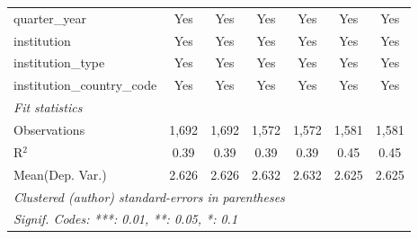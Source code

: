 \begin{tabular}{lcccccc}
   quarter\_year                      & Yes     & Yes      & Yes     & Yes     & Yes     & Yes\\  
   institution                        & Yes     & Yes      & Yes     & Yes     & Yes     & Yes\\  
   institution\_type                  & Yes     & Yes      & Yes     & Yes     & Yes     & Yes\\  
   institution\_country\_code         & Yes     & Yes      & Yes     & Yes     & Yes     & Yes\\  
   \midrule
   \emph{Fit statistics}\\
   Observations                       & 1,692   & 1,692    & 1,572   & 1,572   & 1,581   & 1,581\\  
   R$^2$                              & 0.39    & 0.39     & 0.39    & 0.39    & 0.45    & 0.45\\  
Mean(Dep. Var.) & 2.626 & 2.626 & 2.632 & 2.632 & 2.625 & 2.625 \\
   \midrule \midrule
   \multicolumn{7}{l}{\emph{Clustered (author) standard-errors in parentheses}}\\
   \multicolumn{7}{l}{\emph{Signif. Codes: ***: 0.01, **: 0.05, *: 0.1}}\\
\end{tabular}
\par\endgroup
